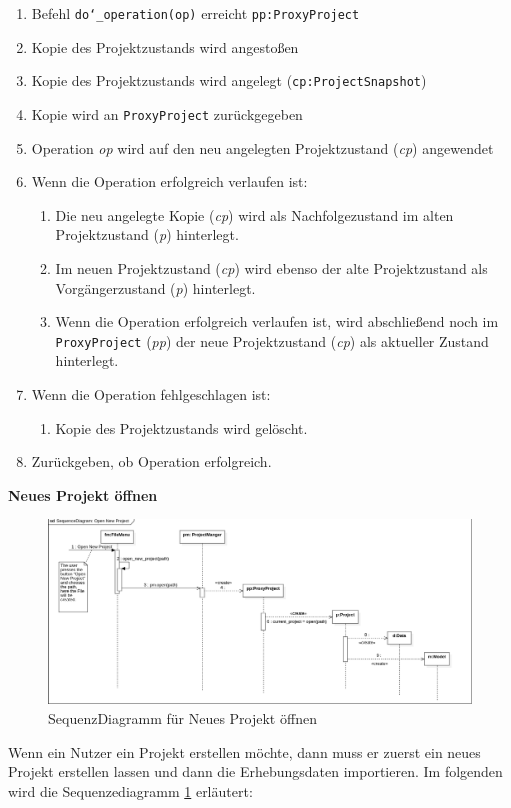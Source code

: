 \documentclass{article}
\begin{document}
\begin{enumerate}
    \item[1.] Befehl \texttt{do\char`_operation(op)} erreicht \texttt{pp:ProxyProject}
    \item[2.] Kopie des Projektzustands wird angestoßen
    \item[3.] Kopie des Projektzustands wird angelegt (\texttt{cp:ProjectSnapshot})
    \item[4.] Kopie wird an \texttt{ProxyProject} zurückgegeben
    \item[4.5.] Operation \emph{op} wird auf den neu angelegten Projektzustand (\emph{cp}) angewendet
    \item[] Wenn die Operation erfolgreich verlaufen ist:
    \begin{enumerate}
        \item[5.] Die neu angelegte Kopie (\emph{cp}) wird als Nachfolgezustand im alten Projektzustand (\emph{p}) hinterlegt.
        \item[7.] Im neuen Projektzustand (\emph{cp}) wird ebenso der alte Projektzustand als Vorgängerzustand (\emph{p}) hinterlegt.
        \item[9.] Wenn die Operation erfolgreich verlaufen ist, wird abschließend noch im \texttt{ProxyProject} (\emph{pp}) der neue Projektzustand (\emph{cp}) als aktueller Zustand hinterlegt.
    \end{enumerate}
    \item[] Wenn die Operation fehlgeschlagen ist:
    \begin{enumerate}
        \item[11.] Kopie des Projektzustands wird gelöscht.
    \end{enumerate}
    \item[12.] Zurückgeben, ob Operation erfolgreich.
    
\end{enumerate}

\textbf{\large{Neues Projekt öffnen}}
\begin{figure}[H]%
    \includegraphics[width=15cm]{entwurf/Entwurf_dokument/img/Alissa/SQOpenNewProject3.png}
    \caption{SequenzDiagramm für Neues Projekt öffnen}
    \label{fig:sq:openNewProject}
\end{figure}
Wenn ein Nutzer ein Projekt erstellen möchte, dann muss er zuerst ein neues Projekt erstellen lassen und dann die Erhebungsdaten importieren. Im folgenden wird die Sequenzediagramm \ref{fig:sq:openNewProject} erläutert:
\end{document}
